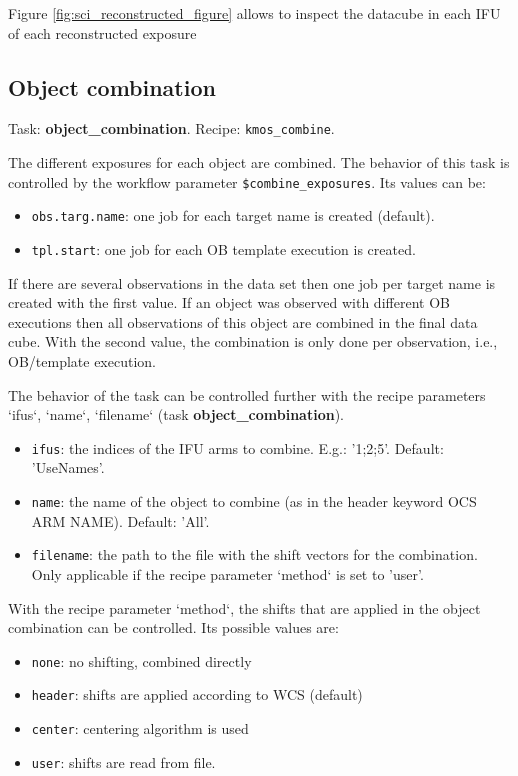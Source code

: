 Figure \ref{fig:sci_reconstructed_figure} allows to inspect the
datacube in each IFU of each reconstructed exposure

\subsection{Object combination}
Task: {\bf object\_combination}. Recipe: {\tt kmos\_combine}.

The different exposures for each object are combined. The behavior of this task is controlled by the workflow parameter
{\tt \$combine\_exposures}. Its values can be:
\begin{itemize}
\item {\tt obs.targ.name}: one job for each target name is created (default).
\item {\tt tpl.start}: one job for each OB template execution is created.
\end{itemize}

If there are several observations in the data set then one job per target name is created with the first
value. If an object was observed with different OB executions then all observations of this object are combined in
the final data cube. With the second value, the combination is only done per observation, i.e., OB/template execution.

The behavior of the task can be controlled further with the recipe parameters `ifus`, `name`, `filename` (task {\bf object\_combination}).
\begin{itemize}
\item {\tt ifus}: the indices of the IFU arms to combine. E.g.: '1;2;5'. Default: 'UseNames'.
\item {\tt name}: the name of the object to combine (as in the header keyword OCS ARM NAME). Default: 'All'.
\item {\tt filename}: the path to the file with the shift vectors for the combination. 
   Only applicable if the recipe parameter `method` is set to 'user'.
\end{itemize}

With the recipe parameter `method`, the shifts that are applied in the object combination can be controlled. 
Its possible values are:
\begin{itemize}
\item {\tt none}: no shifting, combined directly
\item {\tt header}: shifts are applied according to WCS (default)
\item {\tt center}: centering algorithm is used
\item {\tt user}: shifts are read from file.
\end{itemize}


